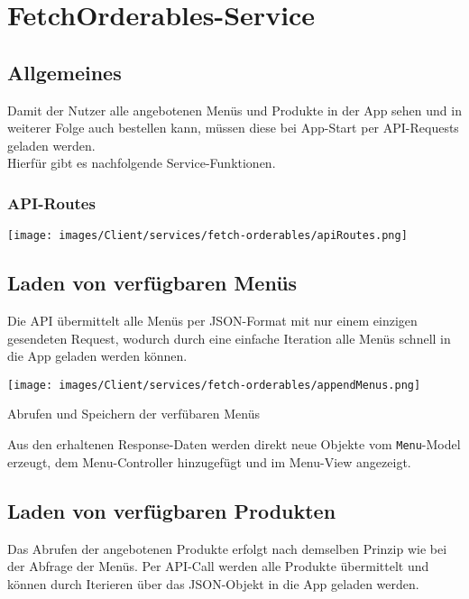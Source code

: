 \section{FetchOrderables-Service}

\subsection{Allgemeines}

Damit der Nutzer alle angebotenen Menüs und Produkte in der App sehen und in weiterer Folge auch
bestellen kann, müssen diese bei App-Start per API-Requests geladen werden.\\
Hierfür gibt es nachfolgende Service-Funktionen.

\subsubsection{API-Routes}

\begin{code}
    \centering
    \texttt{[image: images/Client/services/fetch-orderables/apiRoutes.png]}
    \caption{Benötigte \lstinline{/menu}-, \lstinline{/product}-, und \lstinline{/image}-Routes der Sokka-API}
\end{code}

\subsection{Laden von verfügbaren Menüs}

Die API übermittelt alle Menüs per JSON-Format mit nur einem einzigen gesendeten Request, wodurch
durch eine einfache Iteration alle Menüs schnell in die App geladen werden können.

\begin{code}
    \centering
    \texttt{[image: images/Client/services/fetch-orderables/appendMenus.png]}
    \caption{Abrufen und Speichern der verfübaren Menüs}
\end{code}

Aus den erhaltenen Response-Daten werden direkt neue Objekte vom \lstinline{Menu}-Model erzeugt,
dem Menu-Controller hinzugefügt und im Menu-View angezeigt.

\subsection{Laden von verfügbaren Produkten}

Das Abrufen der angebotenen Produkte erfolgt nach demselben Prinzip wie bei der Abfrage der Menüs.
Per API-Call werden alle Produkte übermittelt und können durch Iterieren über das JSON-Objekt
in die App geladen werden.

